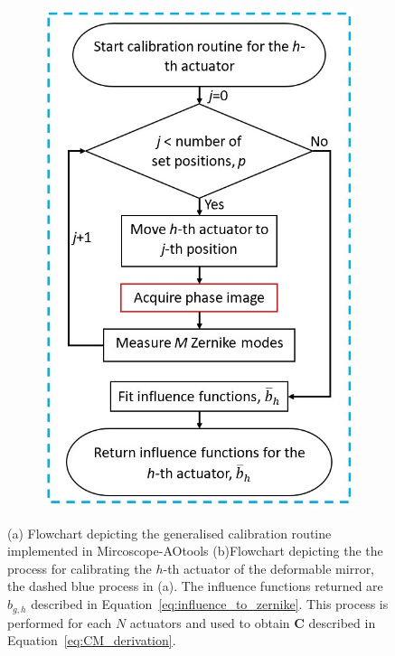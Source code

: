 \begin{figure}[h]
\begin{subfigure}{0.45\textwidth}
		\includegraphics[width=1\linewidth, scale=0.5]{images/Ith_actuator_calibration_workflow_blue_border.jpg}
		\caption{}
		\label{fig:Ith_actuator_calibration_workflow_blue_border}
	\end{subfigure}
	\caption{(a) Flowchart depicting the generalised calibration routine implemented in Mircoscope-AOtools (b)Flowchart depicting the the process for calibrating the $h$-th actuator of the deformable mirror, the dashed blue process in (a). The influence functions returned are $b_{g,h}$ described in Equation~\ref{eq:influence_to_zernike}. This process is performed for each $N$ actuators and used to obtain $\boldsymbol{C}$ described in Equation~\ref{eq:CM_derivation}.}
	\label{fig:calibration_workflow}
\end{figure}

